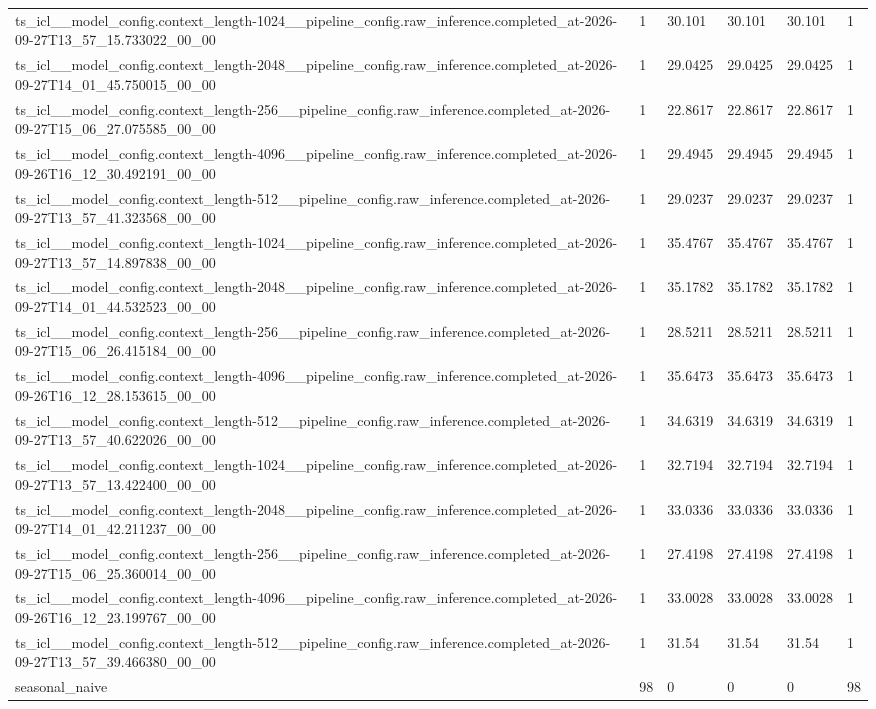 \begin{tabular}{llllll}
ts\_icl\_\_model\_config.context\_length-1024\_\_pipeline\_config.raw\_inference.completed\_at-2026-09-27T13\_57\_15.733022\_00\_00 & 1 & 30.101 & 30.101 & 30.101 & 1 \\
ts\_icl\_\_model\_config.context\_length-2048\_\_pipeline\_config.raw\_inference.completed\_at-2026-09-27T14\_01\_45.750015\_00\_00 & 1 & 29.0425 & 29.0425 & 29.0425 & 1 \\
ts\_icl\_\_model\_config.context\_length-256\_\_pipeline\_config.raw\_inference.completed\_at-2026-09-27T15\_06\_27.075585\_00\_00 & 1 & 22.8617 & 22.8617 & 22.8617 & 1 \\
ts\_icl\_\_model\_config.context\_length-4096\_\_pipeline\_config.raw\_inference.completed\_at-2026-09-26T16\_12\_30.492191\_00\_00 & 1 & 29.4945 & 29.4945 & 29.4945 & 1 \\
ts\_icl\_\_model\_config.context\_length-512\_\_pipeline\_config.raw\_inference.completed\_at-2026-09-27T13\_57\_41.323568\_00\_00 & 1 & 29.0237 & 29.0237 & 29.0237 & 1 \\
ts\_icl\_\_model\_config.context\_length-1024\_\_pipeline\_config.raw\_inference.completed\_at-2026-09-27T13\_57\_14.897838\_00\_00 & 1 & 35.4767 & 35.4767 & 35.4767 & 1 \\
ts\_icl\_\_model\_config.context\_length-2048\_\_pipeline\_config.raw\_inference.completed\_at-2026-09-27T14\_01\_44.532523\_00\_00 & 1 & 35.1782 & 35.1782 & 35.1782 & 1 \\
ts\_icl\_\_model\_config.context\_length-256\_\_pipeline\_config.raw\_inference.completed\_at-2026-09-27T15\_06\_26.415184\_00\_00 & 1 & 28.5211 & 28.5211 & 28.5211 & 1 \\
ts\_icl\_\_model\_config.context\_length-4096\_\_pipeline\_config.raw\_inference.completed\_at-2026-09-26T16\_12\_28.153615\_00\_00 & 1 & 35.6473 & 35.6473 & 35.6473 & 1 \\
ts\_icl\_\_model\_config.context\_length-512\_\_pipeline\_config.raw\_inference.completed\_at-2026-09-27T13\_57\_40.622026\_00\_00 & 1 & 34.6319 & 34.6319 & 34.6319 & 1 \\
ts\_icl\_\_model\_config.context\_length-1024\_\_pipeline\_config.raw\_inference.completed\_at-2026-09-27T13\_57\_13.422400\_00\_00 & 1 & 32.7194 & 32.7194 & 32.7194 & 1 \\
ts\_icl\_\_model\_config.context\_length-2048\_\_pipeline\_config.raw\_inference.completed\_at-2026-09-27T14\_01\_42.211237\_00\_00 & 1 & 33.0336 & 33.0336 & 33.0336 & 1 \\
ts\_icl\_\_model\_config.context\_length-256\_\_pipeline\_config.raw\_inference.completed\_at-2026-09-27T15\_06\_25.360014\_00\_00 & 1 & 27.4198 & 27.4198 & 27.4198 & 1 \\
ts\_icl\_\_model\_config.context\_length-4096\_\_pipeline\_config.raw\_inference.completed\_at-2026-09-26T16\_12\_23.199767\_00\_00 & 1 & 33.0028 & 33.0028 & 33.0028 & 1 \\
ts\_icl\_\_model\_config.context\_length-512\_\_pipeline\_config.raw\_inference.completed\_at-2026-09-27T13\_57\_39.466380\_00\_00 & 1 & 31.54 & 31.54 & 31.54 & 1 \\
seasonal\_naive & 98 & 0 & 0 & 0 & 98 \\
\bottomrule
\end{tabular}

